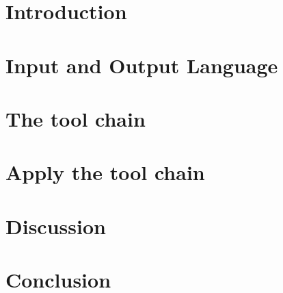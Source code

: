 \documentclass[a4paper,10pt,twoside]{report}
\author{\me}
\begin{document}


\normalsize

\tableofcontents

\setcounter{page}{2}


\chapter{Introduction}\label{chapter:Introduction}


\chapter{Input and Output Language}\label{chapter:Input and Output Language}


\chapter{The tool chain}\label{chapter:The tool chain}


\chapter{Apply the tool chain}\label{chapter:Apply the tool chain}


\chapter{Discussion}\label{chapter:Discussion}


\chapter{Conclusion}\label{chapter:Conclusion}

\end{document}
